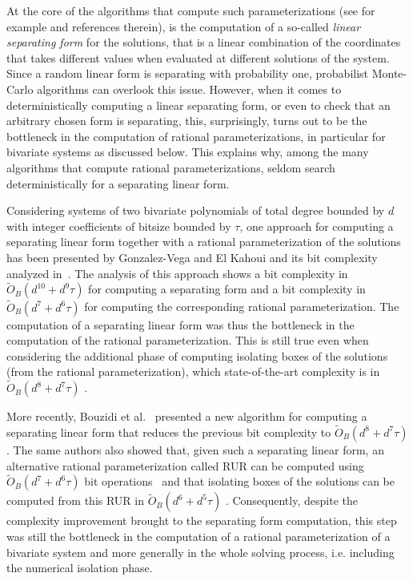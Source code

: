 \documentclass{sig-alternate}
\newcommand{\sOB}{\ensuremath{\widetilde{{O}}_B}}
\newcommand{\blue}[1]{\color{blue}#1\color{black}\xspace}
\renewcommand{\blue}[1]{#1\xspace}
\begin{document}
At the core of the algorithms that compute such 
paramete\-rizations (see for example
\cite{ABRW,bostan2003fast,det-jsc-2009,GLS01,VegKah:curve2d:96,Rou99} and references therein), is
the computation of a so-called \emph{linear separating form} for the solutions, that is  a linear combination of the coordinates that takes different values when evaluated at different solutions of the system.
Since a random linear form is
separating with probability one, 
probabilist Monte-Carlo algorithms can overlook this issue.
However, when it comes to deterministically computing a linear separating
  form, or even to check that an arbitrary chosen form is separating, this, surprisingly, turns out to be the bottleneck in the computation of rational parameterizations, in particular for bivariate systems as discussed below. This explains why, among the many algorithms that compute rational parameterizations, seldom search deterministically for a separating linear form. 

Considering systems of two bivariate polynomials of
  total degree bounded by $d$ with integer coefficients of bitsize bounded by
  $\tau$, one approach for computing a separating linear form together with a rational parameterization of the solutions has been presented by Gonzalez-Vega and El Kahoui \cite{VegKah:curve2d:96} and its bit complexity analyzed in~\cite{det-jsc-2009}. The analysis of this approach shows a bit complexity in $\sOB(d^{10}+d^9\tau)$ for computing a separating form and a bit complexity in $\sOB(d^{7}+d^6\tau)$ for computing the corresponding rational parameterization. The computation of a separating linear form was thus the bottleneck in the computation of the rational parameterization.  This is still true even
  when considering the additional phase of computing isolating boxes of the
  solutions (from the rational parameterization), which state-of-the-art
  complexity is in 
  $\sOB(d^8+d^7\tau)$ 
\blue{\cite[Prop. 35]{bouzidiJSC2014a}}.



More recently, Bouzidi et al.~\blue{\cite{bouzidiJSC2014a}} presented a new
algorithm for computing a separating linear form that reduces the previous bit complexity to
$\sOB(d^8+d^7\tau)$.
The same authors also showed that, given such a
separating linear form, an
alternative rational parameterization called RUR \cite{Rou99} can be computed using
$\sOB(d^7+d^6\tau)$ bit operations~\blue{\cite[Thm. 22]{bouzidiJSC2014a}}
and that isolating boxes
of the solutions can be computed from this RUR in $\sOB(d^6+d^5\tau)$ \cite[Thm. 6.1.2]{bouzidi:thesis}.
Consequently, despite the complexity improvement brought to the separating form computation, this step was still the bottleneck in the computation of a rational parameterization of a bivariate system and more generally in the whole solving process, i.e. including the numerical isolation phase. 
\end{document}
